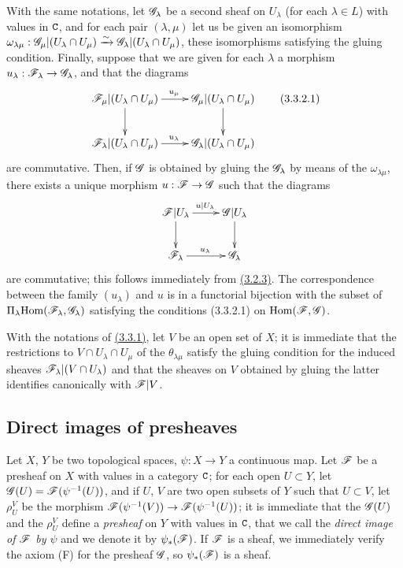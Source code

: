 \begin{env}[3.3.2]
\label{env-0.3.3.2}
With the same notations, let $\mathscr{G}_\lambda$ be a second sheaf on $U_\lambda$
(for each $\lambda\in L$) with values in $\mathtt{C}$, and for each pair $(\lambda,\mu)$
let us be given an isomorphism
$\omega_{\lambda\mu}:\mathscr{G}_\mu|(U_\lambda\cap U_\mu)
  \xrightarrow{\sim}\mathscr{G}_\lambda|(U_\lambda\cap U_\mu)$, these isomorphisms satisfying the
gluing condition. Finally, suppose that we are given for each $\lambda$ a
morphism $u_\lambda:\mathscr{F}_\lambda\to\mathscr{G}_\lambda$, and that the diagrams
\[
  \xymatrix{
    \sh{F}_\mu|(U_\lambda\cap U_\mu)\ar[r]^{u_\mu}\ar[d] &
    \sh{G}_\mu|(U_\lambda\cap U_\mu)\ar[d]\\
    \sh{F}_\lambda|(U_\lambda\cap U_\mu)\ar[r]^{u_\lambda} &
    \sh{G}_\lambda|(U_\lambda\cap U_\mu)
  }
  \tag{3.3.2.1}
\]
are commutative. Then, if $\mathscr{G}$ is obtained by gluing the $\mathscr{G}_\lambda$ by
means of the $\omega_{\lambda\mu}$, there exists a unique morphism
$u:\mathscr{F}\to\mathscr{G}$ such that the diagrams
\[
  \xymatrix{
    \sh{F}|U_\lambda\ar[r]^{u|U_\lambda}\ar[d] &
    \sh{G}|U_\lambda\ar[d]\\
    \sh{F}_\lambda\ar[r]^{u_\lambda} &
    \sh{G}_\lambda
  }
\]
are commutative; this follows immediately from \hyperref[env-0.3.2.3]{(3.2.3)}. The
correspondence between the family $(u_\lambda)$ and $u$ is in a functorial
bijection with the subset of $\Pi_\lambda{\mathop{\mathrm{Hom}}\nolimits}(\mathscr{F}_\lambda,\mathscr{G}_\lambda)$
satisfying the conditions (3.3.2.1) on ${\mathop{\mathrm{Hom}}\nolimits}(\mathscr{F},\mathscr{G})$.
\end{env}

\begin{env}[3.3.3]
\label{env-0.3.3.3}
With the notations of \hyperref[env-0.3.3.1]{(3.3.1)}, let $V$ be an open set of $X$; it is
immediate that the restrictions to $V\cap U_\lambda\cap U_\mu$ of the
$\theta_{\lambda\mu}$ satisfy the gluing condition for the induced sheaves
$\mathscr{F}_\lambda|(V\cap U_\lambda)$ and that the sheaves on $V$ obtained by
gluing the latter identifies canonically with $\mathscr{F}|V$.
\end{env}

\subsection{Direct images of presheaves}
\label{subsection-direct-images-of-presheaves}

\begin{env}[3.4.1]
\label{env-0.3.4.1}
Let $X$, $Y$ be two topological spaces, $\psi:X\to Y$ a continuous map. Let
$\mathscr{F}$ be a presheaf on $X$ with values in a category $\mathtt{C}$; for each open
$U\subset Y$, let $\mathscr{G}(U)=\mathscr{F}(\psi^{-1}(U))$, and if $U$, $V$ are two open
subsets of $Y$ such that $U\subset V$, let $\rho_U^V$ be the morphism
$\mathscr{F}(\psi^{-1}(V))\to\mathscr{F}(\psi^{-1}(U))$; it is immediate that the
$\mathscr{G}(U)$ and the $\rho_U^V$ define a {\em presheaf} on $Y$ with values in
$\mathtt{C}$, that we call the {\em direct image of $\mathscr{F}$ by $\psi$} and we denote
it by $\psi_*(\mathscr{F})$. If $\mathscr{F}$ is a sheaf, we immediately verify the axiom
(F) for the presheaf $\mathscr{G}$, so $\psi_*(\mathscr{F})$ is a sheaf.
\end{env}


